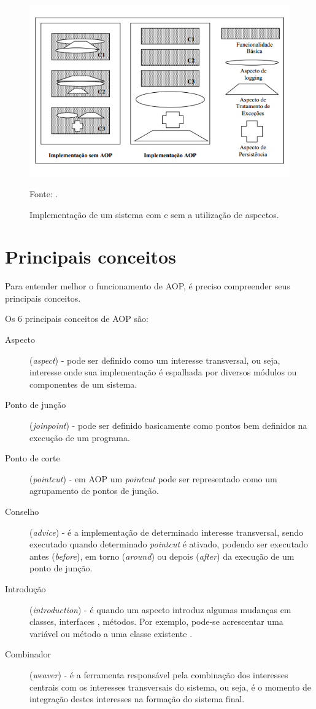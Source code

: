 \documentclass[tc,openright]{iiufrgs}
\begin{document}
\begin{figure}[ht]
	\centering
	\includegraphics[scale=0.6]{figuras/funcionamentoAOP.png}
	\caption{Implementação de um sistema com e sem a utilização de aspectos.}
	\small{Fonte: \cite{steinmacher2003estudo}.}
	\label{fig:funcionamentoAOP}
\end{figure}

\section{Principais conceitos}

Para entender melhor o funcionamento de AOP, é preciso compreender seus principais conceitos. 

Os 6 principais conceitos de AOP são:

\begin{description}
\item [Aspecto] (\textit{aspect}) - pode ser definido como um interesse transversal, ou seja, interesse onde sua implementação é espalhada por diversos módulos ou componentes de um sistema.
\item [Ponto de junção] (\textit{joinpoint}) - pode ser definido basicamente como pontos bem definidos na execução de um programa.
\item [Ponto de corte] (\textit{pointcut}) - em AOP um \textit{pointcut} pode ser representado como um agrupamento de pontos de junção.
\item [Conselho] (\textit{advice}) - é a implementação de determinado interesse transversal, sendo executado quando determinado \textit{pointcut} é ativado, podendo ser executado antes (\textit{before}), em torno (\textit{around}) ou depois (\textit{after}) da execução de um ponto de junção.
\item [Introdução] (\textit{introduction}) - é quando um aspecto introduz algumas mudanças em classes, interfaces , métodos. Por exemplo, pode-se acrescentar uma variável ou método a uma classe existente  \cite{laddad2003aspectj}.
\item [Combinador] (\textit{weaver}) - é a ferramenta responsável pela combinação dos interesses centrais com os interesses transversais do sistema, ou seja,  é o momento de integração destes interesses na formação do sistema final.

\end{description}
\end{document}
